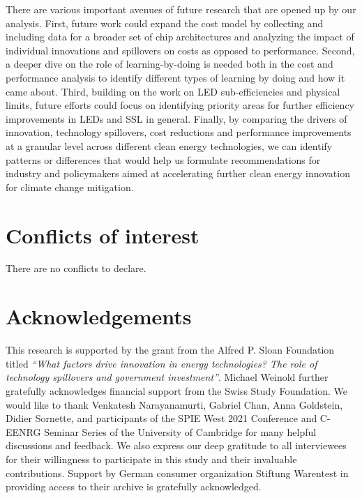 \documentclass[twoside,twocolumn,9pt]{article}
\renewcommand{\refname}{Notes and references}
\begin{document}
There are various important avenues of future research that are opened up by our analysis. First, future work could expand the cost model by collecting and including data for a broader set of chip architectures and analyzing the impact of individual innovations and spillovers on costs as opposed to performance. Second, a deeper dive on the role of learning-by-doing is needed both in the cost and performance analysis to identify different types of learning by doing and how it came about. Third, building on the work on LED sub-efficiencies and physical limits, future efforts could focus on identifying priority areas for further efficiency improvements in LEDs and SSL in general. Finally, by comparing the drivers of innovation, technology spillovers, cost reductions and performance improvements at a granular level across different clean energy technologies, we can identify patterns or differences that would help us formulate recommendations for industry and policymakers aimed at accelerating further clean energy innovation for climate change mitigation. 

\section*{Conflicts of interest}

There are no conflicts to declare.

\section*{Acknowledgements}
This research is supported by the grant from the Alfred P. Sloan Foundation titled \textit{“What factors drive innovation in energy technologies? The role of technology spillovers and government investment”}. Michael Weinold further gratefully acknowledges financial support from the Swiss Study Foundation. We would like to thank Venkatesh Narayanamurti, Gabriel Chan, Anna Goldstein, Didier Sornette, and participants of the SPIE West 2021 Conference and C-EENRG Seminar Series of the University of Cambridge for many helpful discussions and feedback. We also express our deep gratitude to all interviewees for their willingness to participate in this study and their invaluable contributions. Support by German consumer organization Stiftung Warentest in providing access to their archive is gratefully acknowledged.



\balance



\end{document}
